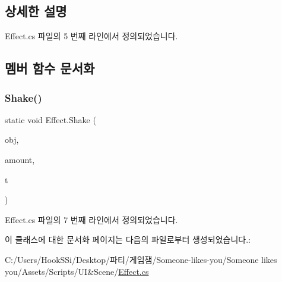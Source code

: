 \subsection{상세한 설명}


Effect.\+cs 파일의 5 번째 라인에서 정의되었습니다.



\subsection{멤버 함수 문서화}
\mbox{\label{class_effect_ab616e21d42dd2721ea79471c9c8026b4}} 
\subsubsection{\texorpdfstring{Shake()}{Shake()}}
{\footnotesize\ttfamily static void Effect.\+Shake (\begin{DoxyParamCaption}\item[{Game\+Object}]{obj,  }\item[{float}]{amount,  }\item[{float}]{t }\end{DoxyParamCaption})\hspace{0.3cm}{\ttfamily [static]}}



Effect.\+cs 파일의 7 번째 라인에서 정의되었습니다.


\begin{DoxyCode}{0}

\end{DoxyCode}


이 클래스에 대한 문서화 페이지는 다음의 파일로부터 생성되었습니다.\+:\begin{DoxyCompactItemize}
\item 
C\+:/\+Users/\+Hook\+S\+Si/\+Desktop/파티/게임잼/\+Someone-\/likes-\/you/\+Someone likes you/\+Assets/\+Scripts/\+U\+I\&\+Scene/\mbox{\hyperlink{_effect_8cs}{Effect.\+cs}}\end{DoxyCompactItemize}
